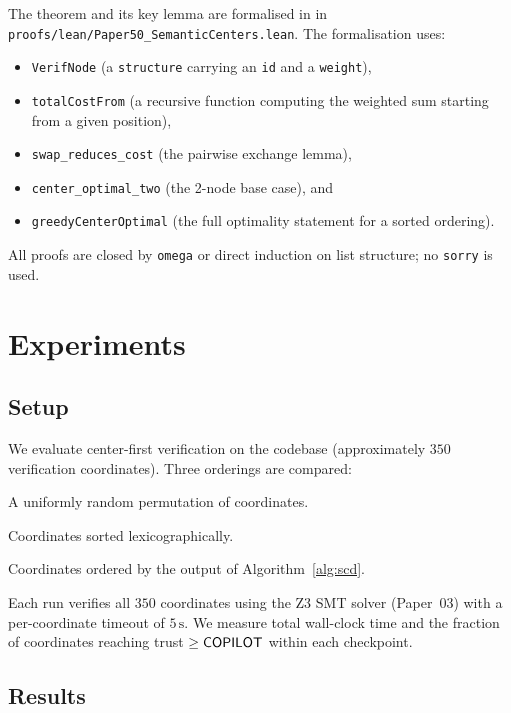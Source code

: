 \documentclass[11pt]{article}
\newcommand{\SCD}{\textsc{SCD}}             %
\begin{document}
The theorem and its key lemma are formalised in
\LEAN{} in \texttt{proofs/lean/Paper50\_SemanticCenters.lean}.
The formalisation uses:
\begin{itemize}[noitemsep]
  \item \texttt{VerifNode} (a \texttt{structure} carrying an \texttt{id}
    and a \texttt{weight}),
  \item \texttt{totalCostFrom} (a recursive function computing the
    weighted sum starting from a given position),
  \item \texttt{swap\_reduces\_cost} (the pairwise exchange lemma),
  \item \texttt{center\_optimal\_two} (the 2-node base case), and
  \item \texttt{greedyCenterOptimal} (the full optimality statement for
    a sorted ordering).
\end{itemize}
All proofs are closed by \texttt{omega} or direct induction on list
structure; no \texttt{sorry} is used.

\section{Experiments}\label{sec:experiments}

\subsection{Setup}

We evaluate center-first verification on the \JuGeo{} codebase
(approximately $350$ verification coordinates).  Three orderings are
compared:
\begin{description}[noitemsep]
  \item[Random] A uniformly random permutation of coordinates.
  \item[Alphabetical] Coordinates sorted lexicographically.
  \item[Center-first (\SCD{})] Coordinates ordered by the output of
        Algorithm~\ref{alg:scd}.
\end{description}
Each run verifies all $350$ coordinates using the Z3 SMT solver
(Paper~03) with a per-coordinate timeout of $5\,\mathrm{s}$.
We measure total wall-clock time and the fraction of coordinates
reaching trust $\geq \mathsf{COPILOT}$ within each checkpoint.

\subsection{Results}
\end{document}
